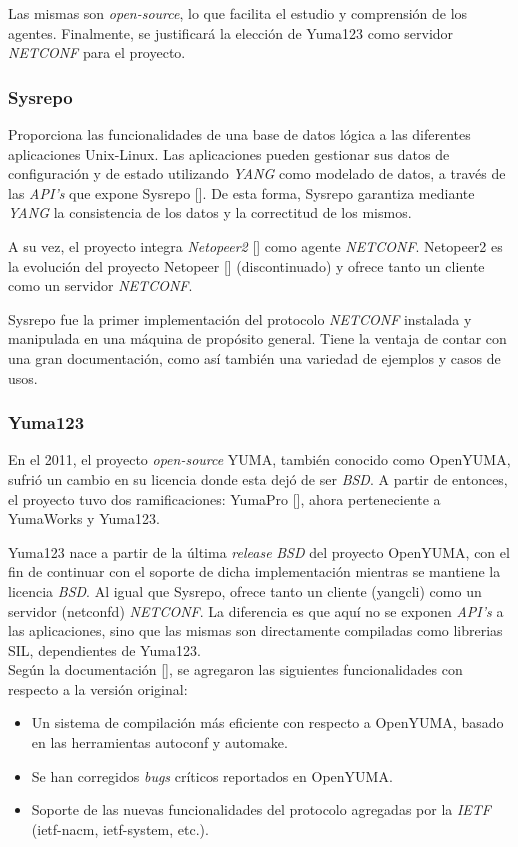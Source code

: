 Las mismas son \textit{open-source}, lo que facilita el estudio y comprensión de los agentes. Finalmente, se justificará la elección de Yuma123 como servidor \textit{NETCONF} para el proyecto.

\subsubsection{Sysrepo}
Proporciona las funcionalidades de una base de datos lógica a las diferentes aplicaciones Unix-Linux. Las aplicaciones pueden gestionar sus datos de configuración y de estado utilizando \textit{YANG} como modelado de datos, a través de las \textit{API’s} que expone Sysrepo []. De esta forma, Sysrepo garantiza mediante \textit{YANG} la consistencia de los datos y la correctitud de los mismos. 

A su vez, el proyecto integra \textit{Netopeer2} [] como agente \textit{NETCONF}. Netopeer2 es la evolución del proyecto Netopeer [] (discontinuado) y ofrece tanto un cliente como un servidor \textit{NETCONF}.

Sysrepo fue la primer implementación del protocolo \textit{NETCONF} instalada y manipulada en una máquina de propósito general. Tiene la ventaja de contar con una gran documentación, como así también una variedad de ejemplos y casos de usos. 

\subsubsection{Yuma123}
En el 2011, el proyecto \textit{open-source} YUMA, también conocido como OpenYUMA, sufrió un cambio en su licencia donde esta dejó de ser \textit{BSD}. A partir de entonces, el proyecto tuvo dos ramificaciones: YumaPro [], ahora perteneciente a YumaWorks y Yuma123. 

Yuma123 nace a partir de la última \textit{release} \textit{BSD} del proyecto OpenYUMA, con el fin de continuar con el soporte de dicha implementación mientras se mantiene la licencia \textit{BSD}. Al igual que Sysrepo, ofrece tanto un cliente (yangcli) como un servidor (netconfd) \textit{NETCONF}. La diferencia es que aquí no se exponen \textit{API’s} a las aplicaciones, sino que las mismas son directamente compiladas como librerias SIL, dependientes de Yuma123. 
\\

Según la documentación [], se agregaron las siguientes funcionalidades con respecto a la versión original:

\begin{itemize}
	\item Un sistema de compilación más eficiente con respecto a OpenYUMA, basado en las herramientas autoconf y automake.
	\item Se han corregidos \textit{bugs} críticos reportados en OpenYUMA.
	\item Soporte de las nuevas funcionalidades del protocolo agregadas por la \textit{IETF} (ietf-nacm, ietf-system, etc.). 
\end{itemize}

